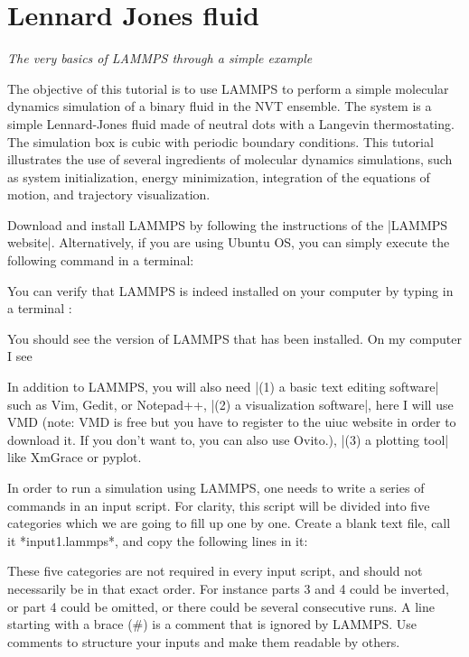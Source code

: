 \chapter{Lennard Jones fluid}

\vspace{-1cm} \noindent \textcolor{graytitle}{\textit{{\Large The very basics of LAMMPS through a simple example}}\vspace{0.5cm} }

The objective of this tutorial is to use
LAMMPS to perform a simple molecular dynamics simulation
of a binary fluid in the NVT ensemble. The system is a simple Lennard-Jones fluid
made of neutral dots with a Langevin thermostating. The
simulation box is cubic with periodic boundary conditions.
This tutorial illustrates the use of several ingredients of
molecular dynamics simulations, such as system initialization,
energy minimization, integration of the equations of motion,
and trajectory visualization.

Download and install LAMMPS by following the instructions of the |LAMMPS website|.
Alternatively, if you are using Ubuntu OS, you can simply execute the
following command in a terminal:

You can verify that LAMMPS is indeed installed on your
computer by typing in a terminal :

You should see the version of LAMMPS that has been
installed. On my computer I see

In addition to LAMMPS, you will also need |(1) a basic text editing software|
such as Vim, Gedit, or Notepad++, |(2) a visualization software|, here I
will use VMD (note: VMD is free but you have to register to
the uiuc website in order to download it. If you don't want
to, you can also use Ovito.), |(3) a plotting tool| like
XmGrace or pyplot.

In order to run a simulation using LAMMPS, one needs to
write a series of commands in an input script. For clarity,
this script will be divided into five categories which we are going to
fill up one by one. Create a blank text file, call it
*input1.lammps*, and copy the following lines in it:

These five categories are not required in every
input script, and should not necessarily be in that
exact order. For instance parts 3 and 4 could be inverted, or
part 4 could be omitted, or there could be several
consecutive runs.
A line starting with a brace (#) is a comment
that is ignored by LAMMPS. Use comments to structure 
your inputs and make them readable by others.

